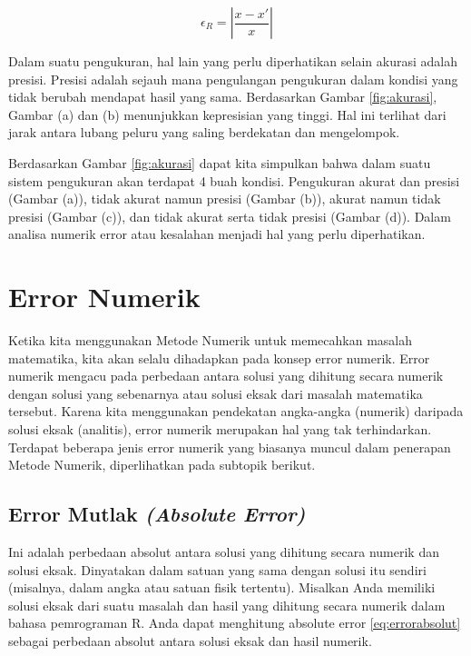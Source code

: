 \documentclass[
]{book}
\theoremstyle{definition}
\theoremstyle{definition}
\theoremstyle{definition}
\theoremstyle{definition}
\theoremstyle{remark}
\begin{document}
\begin{equation}
   \epsilon_R=\left|\frac{x-x'}{x}\right|
  \label{eq:errorrelatif}
\end{equation}

Dalam suatu pengukuran, hal lain yang perlu diperhatikan selain akurasi adalah presisi. Presisi adalah sejauh mana pengulangan pengukuran dalam kondisi yang tidak berubah mendapat hasil yang sama. Berdasarkan Gambar \ref{fig:akurasi}, Gambar (a) dan (b) menunjukkan kepresisian yang tinggi. Hal ini terlihat dari jarak antara lubang peluru yang saling berdekatan dan mengelompok.

Berdasarkan Gambar \ref{fig:akurasi} dapat kita simpulkan bahwa dalam suatu sistem pengukuran akan terdapat 4 buah kondisi. Pengukuran akurat dan presisi (Gambar (a)), tidak akurat namun presisi (Gambar (b)), akurat namun tidak presisi (Gambar (c)), dan tidak akurat serta tidak presisi (Gambar (d)). Dalam analisa numerik error atau kesalahan menjadi hal yang perlu diperhatikan.

\hypertarget{error-numerik}{%
\section{Error Numerik}\label{error-numerik}}

Ketika kita menggunakan Metode Numerik untuk memecahkan masalah matematika, kita akan selalu dihadapkan pada konsep error numerik. Error numerik mengacu pada perbedaan antara solusi yang dihitung secara numerik dengan solusi yang sebenarnya atau solusi eksak dari masalah matematika tersebut. Karena kita menggunakan pendekatan angka-angka (numerik) daripada solusi eksak (analitis), error numerik merupakan hal yang tak terhindarkan. Terdapat beberapa jenis error numerik yang biasanya muncul dalam penerapan Metode Numerik, diperlihatkan pada subtopik berikut.

\hypertarget{error-mutlak-absolute-error}{%
\subsection{\texorpdfstring{Error Mutlak \emph{(Absolute Error)}}{Error Mutlak (Absolute Error)}}\label{error-mutlak-absolute-error}}

Ini adalah perbedaan absolut antara solusi yang dihitung secara numerik dan solusi eksak. Dinyatakan dalam satuan yang sama dengan solusi itu sendiri (misalnya, dalam angka atau satuan fisik tertentu). Misalkan Anda memiliki solusi eksak dari suatu masalah dan hasil yang dihitung secara numerik dalam bahasa pemrograman R. Anda dapat menghitung absolute error \eqref{eq:errorabsolut} sebagai perbedaan absolut antara solusi eksak dan hasil numerik.
\end{document}
